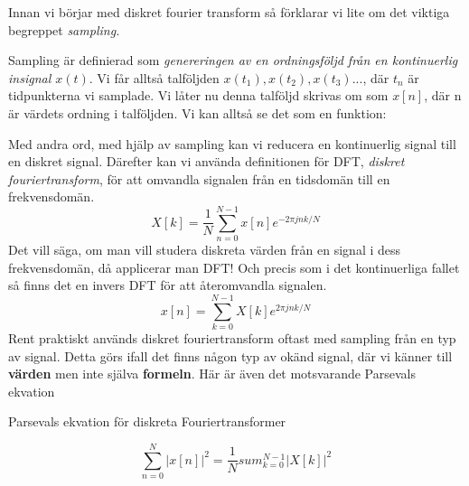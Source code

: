 \documentclass{article}
\begin{document}
Innan vi börjar med diskret fourier transform så förklarar vi lite om
det viktiga begreppet \emph{sampling.}

Sampling är definierad som \emph{genereringen av en ordningsföljd från en
  kontinuerlig insignal $x(t)$}.
Vi får alltså talföljden $x(t_1), x(t_2), x(t_3)... $, där $t_n$ är tidpunkterna
vi samplade. Vi låter nu denna talföljd skrivas om som $x[n]$,
där n är värdets ordning i talföljden. Vi kan alltså se det som en funktion:



Med andra ord, med hjälp av sampling kan vi reducera en kontinuerlig signal
till en diskret signal.
Därefter kan vi använda definitionen för DFT,
\emph{diskret fouriertransform}, för att omvandla signalen från en tidsdomän
till en frekvensdomän.
$$X[k] = \frac{1}{N} \sum_{n=0}^{N-1} x[n] e^{-2 \pi j n k/N}$$
Det vill säga, om man vill studera diskreta värden från en signal
i dess frekvensdomän, då applicerar man DFT! Och precis som i det kontinuerliga
fallet så finns det en invers DFT för att återomvandla signalen.
$$x[n] = \sum_{k=0}^{N-1} X[k] e^{2 \pi j n k/N}$$
Rent praktiskt används diskret fouriertransform oftast med sampling från en
typ av signal. Detta görs ifall det finns någon typ av okänd signal,
där vi känner till \textbf{värden} men inte själva \textbf{formeln}.
Här är även det motsvarande Parsevals ekvation

Parsevals ekvation för diskreta Fouriertransformer

$$\sum_{n=0}^{N} |x[n]|^2 = \frac{1}{N} sum_{k=0}^{N-1} |X[k]|^2$$

\end{document}
